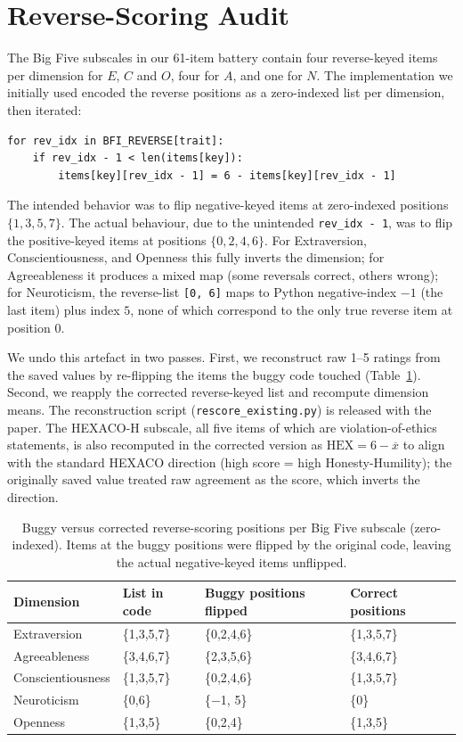 \documentclass[11pt]{article}
\begin{document}
\section{Reverse-Scoring Audit}
\label{appendix:scoring}

The Big Five subscales in our 61-item battery contain four reverse-keyed items per dimension for $E$, $C$ and $O$, four for $A$, and one for $N$.
The implementation we initially used encoded the reverse positions as a zero-indexed list per dimension, then iterated:

\begin{verbatim}
for rev_idx in BFI_REVERSE[trait]:
    if rev_idx - 1 < len(items[key]):
        items[key][rev_idx - 1] = 6 - items[key][rev_idx - 1]
\end{verbatim}

The intended behavior was to flip negative-keyed items at zero-indexed positions $\{1, 3, 5, 7\}$.
The actual behaviour, due to the unintended \texttt{rev\_idx - 1}, was to flip the positive-keyed items at positions $\{0, 2, 4, 6\}$.
For Extraversion, Conscientiousness, and Openness this fully inverts the dimension; for Agreeableness it produces a mixed map (some reversals correct, others wrong); for Neuroticism, the reverse-list \texttt{[0, 6]} maps to Python negative-index $-1$ (the last item) plus index $5$, none of which correspond to the only true reverse item at position $0$.

We undo this artefact in two passes.
First, we reconstruct raw 1--5 ratings from the saved values by re-flipping the items the buggy code touched (Table~\ref{tab:scoring_audit}).
Second, we reapply the corrected reverse-keyed list and recompute dimension means.
The reconstruction script (\texttt{rescore\_existing.py}) is released with the paper.
The HEXACO-H subscale, all five items of which are violation-of-ethics statements, is also recomputed in the corrected version as $\mathrm{HEX} = 6 - \overline{x}$ to align with the standard HEXACO direction (high score = high Honesty-Humility); the originally saved value treated raw agreement as the score, which inverts the direction.

\begin{table}[!htb]
\centering
\footnotesize
\caption{Buggy versus corrected reverse-scoring positions per Big Five subscale (zero-indexed). Items at the buggy positions were flipped by the original code, leaving the actual negative-keyed items unflipped.}
\label{tab:scoring_audit}
\begin{tabular}{llll}
\toprule
Dimension & List in code & Buggy positions flipped & Correct positions \\
\midrule
Extraversion      & \{1,3,5,7\} & \{0,2,4,6\} & \{1,3,5,7\} \\
Agreeableness     & \{3,4,6,7\} & \{2,3,5,6\} & \{3,4,6,7\} \\
Conscientiousness & \{1,3,5,7\} & \{0,2,4,6\} & \{1,3,5,7\} \\
Neuroticism       & \{0,6\}     & \{$-$1, 5\} & \{0\} \\
Openness          & \{1,3,5\}   & \{0,2,4\}   & \{1,3,5\} \\
\bottomrule
\end{tabular}
\end{table}
\end{document}
